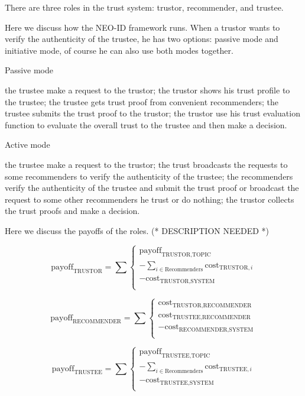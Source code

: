 \documentclass{article}
\begin{document}
There are three roles in the trust system: trustor, recommender, and trustee.

Here we discuss how the NEO-ID framework runs. When a trustor wants to verify the authenticity of the trustee, he has two options: passive mode and
initiative mode, of course he can also use both modes together.

Passive mode

the trustee make a request to the trustor; the trustor shows his trust profile to the trustee; the trustee gets trust proof from convenient recommenders;
the trustee submits the trust proof to the trustor; the trustor use his trust evaluation function to evaluate the overall trust to the trustee and
then make a decision.

Active mode

the trustee make a request to the trustor; the trust broadcasts the requests to some recommenders to verify the authenticity of the trustee; the
recommenders verify the authenticity of the trustee and submit the trust proof or broadcast the request to some other recommenders he trust or do
nothing; the trustor collects the trust proofs and make a decision.

Here we discuss the payoffs of the roles. (* DESCRIPTION NEEDED *)

\begin{equation}
\text{payoff}_{\text{TRUSTOR}}=\sum \left\{
\begin{array}{c}
 \text{payoff}_{\text{TRUSTOR},\text{TOPIC}} \\
 -\sum _{i\in \text{Recommenders}} \text{cost}_{\text{TRUSTOR},i} \\
 -\text{cost}_{\text{TRUSTOR},\text{SYSTEM}} \\
\end{array}
\right.
\end{equation}

\begin{equation}
\text{payoff}_{\text{RECOMMENDER}}=\sum \left\{
\begin{array}{c}
 \text{cost}_{\text{TRUSTOR},\text{RECOMMENDER}} \\
 \text{cost}_{\text{TRUSTEE},\text{RECOMMENDER}} \\
 -\text{cost}_{\text{RECOMMENDER},\text{SYSTEM}} \\
\end{array}
\right.
\end{equation}

\begin{equation}
\text{payoff}_{\text{TRUSTEE}}=\sum \left\{
\begin{array}{c}
 \text{payoff}_{\text{TRUSTEE},\text{TOPIC}} \\
 -\sum _{i\in \text{Recommenders}} \text{cost}_{\text{TRUSTEE},i} \\
 -\text{cost}_{\text{TRUSTEE},\text{SYSTEM}} \\
\end{array}
\right.
\end{equation}
\end{document}

